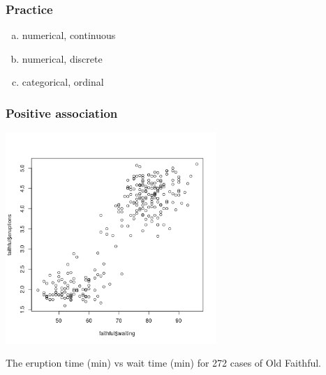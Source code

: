 
\begin{frame}
\frametitle{Practice}


\begin{enumerate}[(a)]
\item numerical, continuous
\item numerical, discrete
\item categorical, ordinal
\end{enumerate}

\end{frame}




\begin{frame}
\frametitle{Positive association}

\begin{center}
\includegraphics[width=0.6\textwidth]{figures/faithful/faithful}
\end{center}

\small
The eruption time (min) vs wait time (min) for 272 cases of Old Faithful.

\end{frame}

